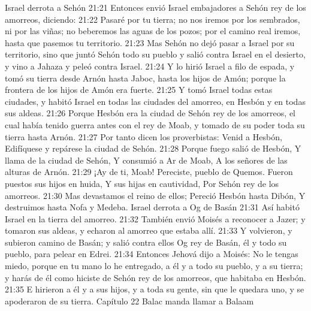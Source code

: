 Israel derrota a Sehón   
21:21 Entonces envió Israel embajadores a Sehón rey de los amorreos, diciendo:  
21:22 Pasaré por tu tierra; no nos iremos por los sembrados, ni por las viñas; no beberemos las aguas de los pozos; por el camino real iremos, hasta que pasemos tu territorio.  
21:23 Mas Sehón no dejó pasar a Israel por su territorio, sino que juntó Sehón todo su pueblo y salió contra Israel en el desierto, y vino a Jahaza y peleó contra Israel.  
21:24 Y lo hirió Israel a filo de espada, y tomó su tierra desde Arnón hasta Jaboc, hasta los hijos de Amón; porque la frontera de los hijos de Amón era fuerte.  
21:25 Y tomó Israel todas estas ciudades, y habitó Israel en todas las ciudades del amorreo, en Hesbón y en todas sus aldeas.  
21:26 Porque Hesbón era la ciudad de Sehón rey de los amorreos, el cual había tenido guerra antes con el rey de Moab, y tomado de su poder toda su tierra hasta Arnón.  
21:27 Por tanto dicen los proverbistas:  
Venid a Hesbón,  
Edifíquese y repárese la ciudad de Sehón. 
21:28 Porque fuego salió de Hesbón,  
Y llama de la ciudad de Sehón,  
Y consumió a Ar de Moab,  
A los señores de las alturas de Arnón.  
21:29 ¡Ay de ti, Moab!  
Pereciste, pueblo de Quemos.  
Fueron puestos sus hijos en huida,  
Y sus hijas en cautividad,  
Por Sehón rey de los amorreos.  
21:30 Mas devastamos el reino de ellos;  
Pereció Hesbón hasta Dibón,  
Y destruimos hasta Nofa y Medeba.  
Israel derrota a Og de Basán   
21:31 Así habitó Israel en la tierra del amorreo.  
21:32 También envió Moisés a reconocer a Jazer; y tomaron sus aldeas, y echaron al amorreo que estaba allí.  
21:33 Y volvieron, y subieron camino de Basán; y salió contra ellos Og rey de Basán, él y todo su pueblo, para pelear en Edrei.  
21:34 Entonces Jehová dijo a Moisés: No le tengas miedo, porque en tu mano lo he entregado, a él y a todo su pueblo, y a su tierra; y harás de él como hiciste de Sehón rey de los amorreos, que habitaba en Hesbón.  
21:35 E hirieron a él y a sus hijos, y a toda su gente, sin que le quedara uno, y se apoderaron de su tierra.  
Capítulo 22 
Balac manda llamar a Balaam  

